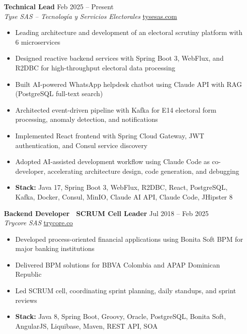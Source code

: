 \documentclass[11pt,a4paper]{article}
\begin{document}
\textbf{Technical Lead} \hfill {\color{lighttext} Feb 2025 -- Present} \\
\textit{Tyse SAS -- Tecnolog\'{i}a y Servicios Electorales} \hfill \href{https://www.tysesas.com}{tysesas.com}
\begin{itemize}
    \item Leading architecture and development of an electoral scrutiny platform with 6 microservices
    \item Designed reactive backend services with Spring Boot 3, WebFlux, and R2DBC for high-throughput electoral data processing
    \item Built AI-powered WhatsApp helpdesk chatbot using Claude API with RAG (PostgreSQL full-text search)
    \item Architected event-driven pipeline with Kafka for E14 electoral form processing, anomaly detection, and notifications
    \item Implemented React frontend with Spring Cloud Gateway, JWT authentication, and Consul service discovery
    \item Adopted AI-assisted development workflow using Claude Code as co-developer, accelerating architecture design, code generation, and debugging
    \item \textbf{Stack:} Java 17, Spring Boot 3, WebFlux, R2DBC, React, PostgreSQL, Kafka, Docker, Consul, MinIO, Claude AI API, Claude Code, JHipster 8
\end{itemize}

\vspace{4pt}

\textbf{Backend Developer \textbar\ SCRUM Cell Leader} \hfill {\color{lighttext} Jul 2018 -- Feb 2025} \\
\textit{Trycore SAS} \hfill \href{https://www.trycore.co}{trycore.co}
\begin{itemize}
    \item Developed process-oriented financial applications using Bonita Soft BPM for major banking institutions
    \item Delivered BPM solutions for BBVA Colombia and APAP Dominican Republic
    \item Led SCRUM cell, coordinating sprint planning, daily standups, and sprint reviews
    \item \textbf{Stack:} Java 8, Spring Boot, Groovy, Oracle, PostgreSQL, Bonita Soft, AngularJS, Liquibase, Maven, REST API, SOA
\end{itemize}

\vspace{4pt}
\end{document}
